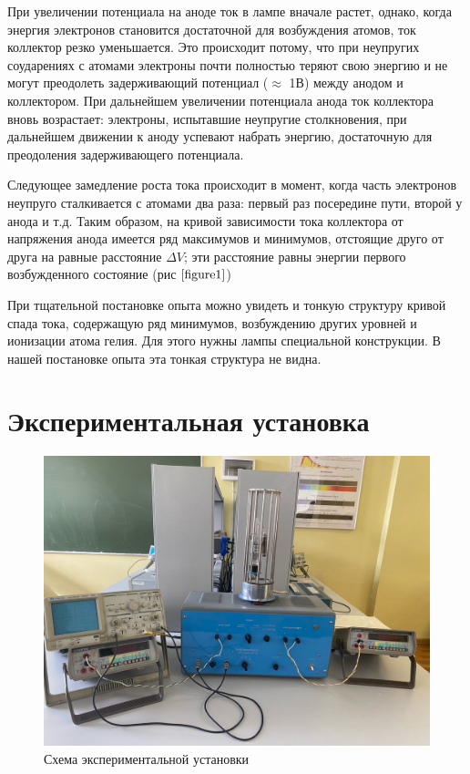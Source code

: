 \documentclass[a4paper,12pt]{article}
\begin{document}
При увеличении потенциала на аноде ток в лампе вначале растет, однако, когда энергия электронов становится достаточной для возбуждения атомов, ток коллектор резко уменьшается. Это происходит потому, что при неупругих соударениях с атомами электроны почти полностью теряют свою энергию и не могут преодолеть задерживающий потенциал ($\approx$ 1В) между анодом и коллектором. При дальнейшем увеличении потенциала анода ток коллектора вновь возрастает: электроны, испытавшие неупругие столкновения, при дальнейшем движении к аноду успевают набрать энергию, достаточную для преодоления задерживающего потенциала.

Следующее замедление роста тока происходит в момент, когда часть электронов неупруго сталкивается с атомами два раза: первый раз посередине пути, второй у анода  и т.д. Таким образом, на кривой зависимости тока коллектора от напряжения анода имеется ряд максимумов и минимумов, отстоящие друго от друга на равные расстояние $\Delta V$; эти расстояние равны энергии первого возбужденного состояние (рис $\ref{figure1}$)

При тщательной постановке опыта можно увидеть и тонкую структуру кривой спада тока, содержащую ряд минимумов, возбуждению других уровней и ионизации атома гелия. Для этого нужны лампы специальной конструкции. В нашей постановке опыта эта тонкая структура не видна.

\newpage

\section*{Экспериментальная установка}

\begin{figure}[h]
    \centering
    \includegraphics[width=15cm]{fig3}
    \caption{Схема экспериментальной установки}
    \label{fig:vac}
\end{figure}
\end{document}
